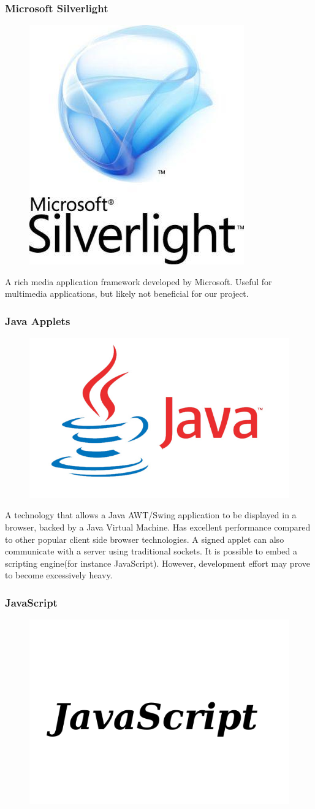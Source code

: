 \subsubsection{Microsoft Silverlight}

\begin{figure}
\vspace{-47pt}
\centering
\includegraphics[width=.10\textwidth]{image/silverlight-logo.jpg}
\end{figure}

A rich media application framework developed by Microsoft. Useful for multimedia applications, but likely not beneficial for our project.

\subsubsection{Java Applets}

\begin{figure}
\vspace{-30pt}
\centering
\includegraphics[width=.14\textwidth]{image/java-logo.jpg}
\end{figure}

A technology that allows a Java AWT/Swing application to be displayed in a browser, backed by a Java Virtual Machine. Has excellent performance compared to other popular client side browser technologies. A signed applet can also communicate with a server using traditional sockets. It is possible to embed a scripting engine(for instance JavaScript). However, development effort may prove to become excessively heavy.

\subsubsection{JavaScript}

\begin{figure}
\vspace{-20pt}
\centering
\includegraphics[width=.14\textwidth]{image/javascript-logo.png}
\end{figure}


